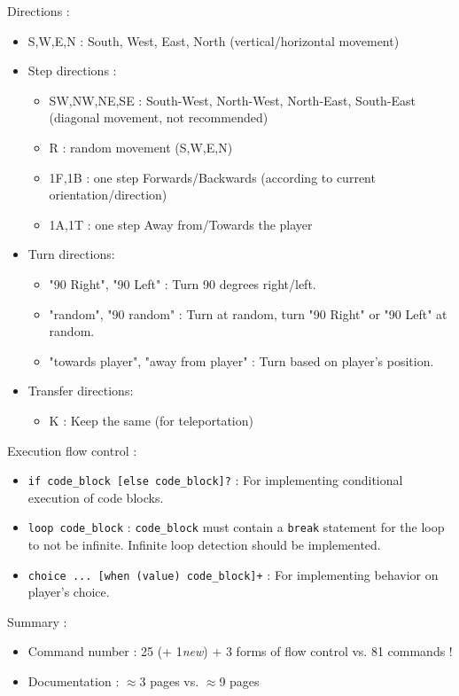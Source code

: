 \documentclass[11pt]{article}
\begin{document}
{Directions :
\begin{itemize}
	\item S,W,E,N : South, West, East, North (vertical/horizontal movement)
	
	\item Step directions :
	\begin{itemize}
		\item SW,NW,NE,SE : South-West, North-West, North-East, South-East (diagonal movement, not recommended)
		\item R : random movement (S,W,E,N)
		\item 1F,1B : one step Forwards/Backwards (according to current orientation/direction)
		\item 1A,1T : one step Away from/Towards the player
	\end{itemize}
	
	\item Turn directions:
	\begin{itemize}
		\item "90 Right", "90 Left" : Turn 90 degrees right/left.
		\item "random", "90 random" : Turn at random, turn "90 Right" or "90 Left" at random.
		\item "towards player", "away from player" : Turn based on player's position.
	\end{itemize}
	
	\item Transfer directions:
	\begin{itemize}
		\item K : Keep the same (for teleportation)
	\end{itemize}	
\end{itemize}

\newpage
Execution flow control :
\begin{itemize}
	\item \verb|if code_block [else code_block]?| : For implementing conditional execution of code blocks.
	\item \verb|loop code_block| : \verb|code_block| must contain a \verb|break| statement for the loop to not be infinite. Infinite loop detection should be implemented.
	\item \verb|choice ... [when (value) code_block]+| : For implementing behavior on player's choice.
\end{itemize}

Summary : 
\begin{itemize}
	\item Command number : 25 (+ 1\textit{new}) $+$ 3 forms of flow control vs. 81 commands !
	\item Documentation : $\approx$3 pages vs. $\approx$9 pages
\end{itemize}



}
\end{document}
